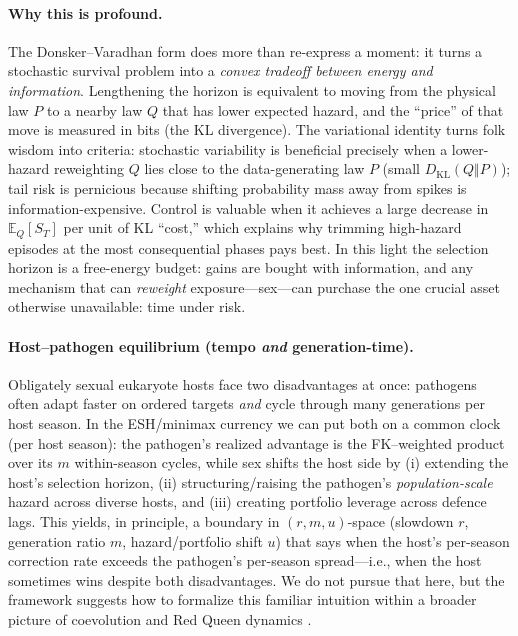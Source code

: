\documentclass[11pt]{article}
\theoremstyle{upright}
\newcommand{\E}{\mathbb{E}}
\begin{document}
\paragraph{Why this is profound.}
The Donsker--Varadhan form does more than re-express a moment: it turns a stochastic survival problem into a \emph{convex tradeoff between energy and information}.
Lengthening the horizon is equivalent to moving from the physical law $P$ to a nearby law $Q$ that has lower expected hazard, and the
``price'' of that move is measured in bits (the KL divergence).  The variational identity turns folk wisdom into criteria: stochastic variability 
is beneficial precisely when a lower-hazard reweighting $Q$ lies close to the data-generating law $P$ (small $D_{\mathrm{KL}}(Q\Vert P)$); 
tail risk is pernicious because shifting probability mass away from spikes is information-expensive. Control is valuable when it achieves 
a large decrease in $\E_Q[S_T]$ per unit of KL “cost,” which explains why trimming high-hazard episodes at the most consequential 
phases pays best. In this light the selection horizon is a free-energy budget: gains are bought with information, and any mechanism 
that can \emph{reweight} exposure—sex—can purchase the one crucial asset otherwise unavailable: time under risk.

\paragraph{Host–pathogen equilibrium (tempo \emph{and} generation-time).}
Obligately sexual eukaryote hosts face two disadvantages at once: pathogens often adapt faster on ordered targets \emph{and} cycle 
through many generations per host season. In the ESH/minimax currency we can put both on a common clock (per host season): 
the pathogen’s realized advantage is the FK–weighted product over its $m$ within-season cycles, while sex shifts the host side 
by (i) extending the host’s selection horizon, (ii) structuring/raising the pathogen’s \emph{population-scale} hazard across diverse 
hosts, and (iii) creating portfolio leverage across defence lags. This yields, in principle, a boundary 
in \((r, m, u)\)-space (slowdown \(r\), generation ratio \(m\), hazard/portfolio shift \(u\)) that says when the host’s per-season correction 
rate exceeds the pathogen’s per-season spread—i.e., when the host sometimes wins despite both disadvantages. We do not pursue that 
here, but the framework suggests how to formalize this familiar intuition within a broader picture of coevolution and Red
Queen dynamics \citep{Hamilton1981} \citep{AndersonMay1982} \citep{Woolhouse2002}.
\end{document}
